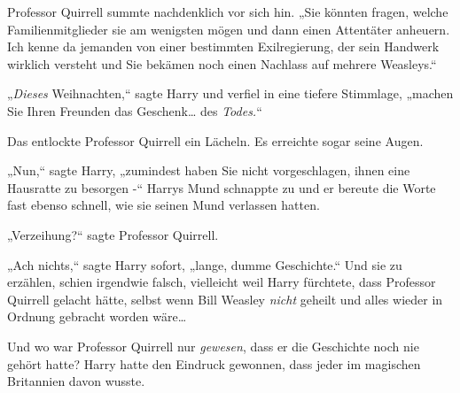 Professor Quirrell summte nachdenklich vor sich hin. „Sie könnten fragen, welche Familienmitglieder sie am wenigsten mögen und dann einen Attentäter anheuern. Ich kenne da jemanden von einer bestimmten Exilregierung, der sein Handwerk wirklich versteht und Sie bekämen noch einen Nachlass auf mehrere Weasleys.“

„\emph{Dieses} Weihnachten,“ sagte Harry und verfiel in eine tiefere Stimmlage, „machen Sie Ihren Freunden das Geschenk… des \emph{Todes.}“

Das entlockte Professor Quirrell ein Lächeln. Es erreichte sogar seine Augen.

„Nun,“ sagte Harry, „zumindest haben Sie nicht vorgeschlagen, ihnen eine Hausratte zu besorgen -“ Harrys Mund schnappte zu und er bereute die Worte fast ebenso schnell, wie sie seinen Mund verlassen hatten.

„Verzeihung?“ sagte Professor Quirrell.

„Ach nichts,“ sagte Harry sofort, „lange, dumme Geschichte.“ Und sie zu erzählen, schien irgendwie falsch, vielleicht weil Harry fürchtete, dass Professor Quirrell gelacht hätte, selbst wenn Bill Weasley \emph{nicht} geheilt und alles wieder in Ordnung gebracht worden wäre…

Und wo war Professor Quirrell nur \emph{gewesen}, dass er die Geschichte noch nie gehört hatte? Harry hatte den Eindruck gewonnen, dass jeder im magischen Britannien davon wusste.

